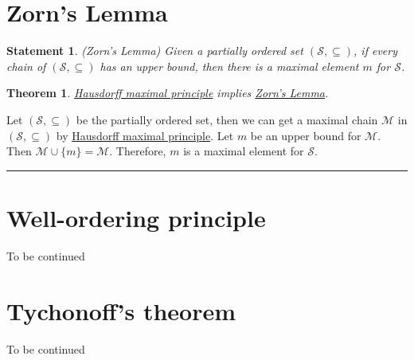 \documentclass{article}
\numberwithin{equation}{section}
\theoremstyle{plain} %
\newtheorem{theorem}[equation]{Theorem}
\newtheorem{statement}[equation]{Statement}
\theoremstyle{definition}
\theoremstyle{remark}
\newenvironment{proof}{{\bf Proof:}}{\hfill\rule{2mm}{2mm}}
\begin{document}
\section{Zorn's Lemma}

\begin{statement}
\label{statement:Zorn's Lemma}
\textup{(Zorn's Lemma)} \textit{Given a partially ordered set $(\mathcal{S}, \subseteq)$, if every chain of $(\mathcal{S}, \subseteq)$ has an upper bound, then there is a maximal element $m$ for $\mathcal{S}$. }
\end{statement}

\begin{theorem}
\hyperref[statement:Hausdorff maximal principle]{Hausdorff maximal principle} implies \hyperref[statement:Zorn's Lemma]{Zorn's Lemma}.
\end{theorem}

\begin{proof}
Let $(\mathcal{S}, \subseteq)$ be the partially ordered set, then we can get a maximal chain  $\mathcal{M}$ in $(\mathcal{S}, \subseteq)$ by \hyperref[statement:Hausdorff maximal principle]{Hausdorff maximal principle}. Let $m$ be an upper bound for $\mathcal{M}$. Then $\mathcal{M} \cup \{m\} = \mathcal{M}$. Therefore, $m$ is a maximal element for $\mathcal{S}$. 
\end{proof}

\section{Well-ordering principle}
To be continued

\section{Tychonoff's theorem}
To be continued


%  	
%
%


\end{document}
